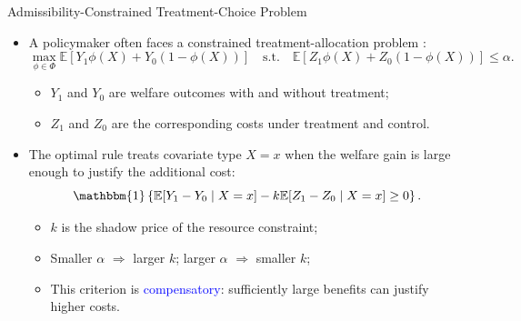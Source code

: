\documentclass[aspectratio=169,xcolor=dvipsnames]{beamer}
\begin{document}
\begin{frame}{Admissibility-Constrained Treatment-Choice Problem}
    \begin{itemize}
        \item A policymaker often faces a constrained treatment-allocation problem
        \citep*{FengHongNekipelov2026}:
            \[
            \max_{\phi \in \Phi}
            \mathbb{E}\left[
            Y_1\phi(X) + Y_0(1- \phi(X))
            \right]
            \quad
            \text{s.t.}
            \quad
            \mathbb{E}\left[
            Z_1\phi(X) + Z_0(1-\phi(X))
            \right] \leq \alpha.
            \]
            \vspace{-0.9em}
            \begin{itemize}
                \item[-] $Y_1$ and $Y_0$ are welfare outcomes with and without treatment;
                \item[-] $Z_1$ and $Z_0$ are the corresponding costs under treatment and control.
            \end{itemize}
            
        \bigskip
        \item The optimal rule treats covariate type $X=x$ when the welfare gain is large enough to justify the additional cost:
            \[
            \mathbbm{1}\left\{
            \mathbb{E}[Y_1 - Y_0 \mid X=x]
            -
            k\mathbb{E}[Z_1 - Z_0 \mid X=x]
            \geq 0
            \right\}.
            \]
            \vspace{-0.9em}
            \begin{itemize}
                \item[-] $k$ is the shadow price of the resource constraint;
                \item[-] Smaller $\alpha$ $\Rightarrow$ larger $k$; larger $\alpha$ $\Rightarrow$ smaller $k$;
                \item[-] This criterion is \textcolor{blue}{compensatory}: sufficiently large benefits can justify higher costs.
            \end{itemize}
    \end{itemize}
\end{frame}
\end{document}
